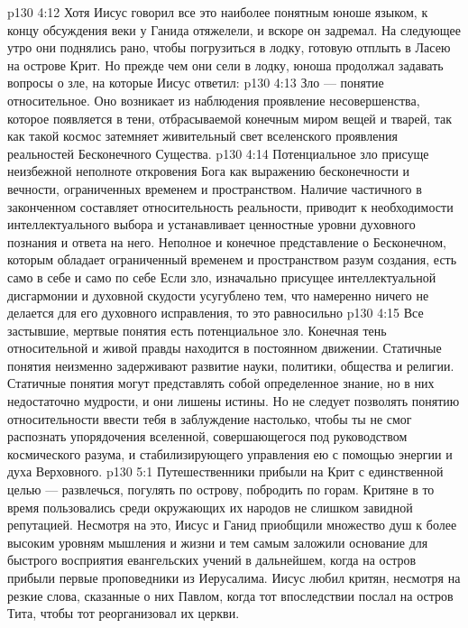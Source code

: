 \vs p130 4:12 \pc Хотя Иисус говорил все это наиболее понятным юноше языком, к концу обсуждения веки у Ганида отяжелели, и вскоре он задремал. На следующее утро они поднялись рано, чтобы погрузиться в лодку, готовую отплыть в Ласею на острове Крит. Но прежде чем они сели в лодку, юноша продолжал задавать вопросы о зле, на которые Иисус ответил:
\vs p130 4:13 \pc Зло --- понятие относительное. Оно возникает из наблюдения проявление несовершенства, которое появляется в тени, отбрасываемой конечным миром вещей и тварей, так как такой космос затемняет живительный свет вселенского проявления реальностей Бесконечного Существа.
\vs p130 4:14 Потенциальное зло присуще неизбежной неполноте откровения Бога как выражению бесконечности и вечности, ограниченных временем и пространством. Наличие частичного в законченном составляет относительность реальности, приводит к необходимости интеллектуального выбора и устанавливает ценностные уровни духовного познания и ответа на него. Неполное и конечное представление о Бесконечном, которым обладает ограниченный временем и пространством разум создания, есть само в себе и само по себе  Если зло, изначально присущее интеллектуальной дисгармонии и духовной скудости усугублено тем, что намеренно ничего не делается для его духовного исправления, то это равносильно 
\vs p130 4:15 Все застывшие, мертвые понятия есть потенциальное зло. Конечная тень относительной и живой правды находится в постоянном движении. Статичные понятия неизменно задерживают развитие науки, политики, общества и религии. Статичные понятия могут представлять собой определенное знание, но в них недостаточно мудрости, и они лишены истины. Но не следует позволять понятию относительности ввести тебя в заблуждение настолько, чтобы ты не смог распознать упорядочения вселенной, совершающегося под руководством космического разума, и стабилизирующего управления ею с помощью энергии и духа Верховного.
\vs p130 5:1 Путешественники прибыли на Крит с единственной целью --- развлечься, погулять по острову, побродить по горам. Критяне в то время пользовались среди окружающих их народов не слишком завидной репутацией. Несмотря на это, Иисус и Ганид приобщили множество душ к более высоким уровням мышления и жизни и тем самым заложили основание для быстрого восприятия евангельских учений в дальнейшем, когда на остров прибыли первые проповедники из Иерусалима. Иисус любил критян, несмотря на резкие слова, сказанные о них Павлом, когда тот впоследствии послал на остров Тита, чтобы тот реорганизовал их церкви.
